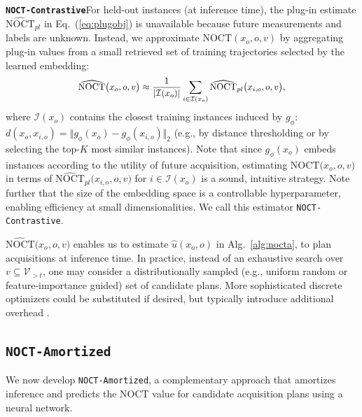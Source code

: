 \textbf{\texttt{NOCT-Contrastive}}\quad For held-out instances (at inference time), the plug-in estimate $\widehat{\mathrm{NOCT}}_{pl}$ in Eq.~(\ref{eq:plugobj}) is unavailable because future measurements and labels are unknown. Instead, we approximate $\mathrm{NOCT}(x_o,o,v)$ by aggregating plug-in values from a small retrieved set of training trajectories selected by the learned embedding:
\begin{equation}
\scalebox{0.93}{$\displaystyle \widehat{\mathrm{NOCT}}\bigl({x}_{o}, o, v\bigr)\approx \frac{1}{|\mathcal{I}(x_o)|}\sum_{i \in \mathcal{I}(x_o)} \widehat{\mathrm{NOCT}}_{pl}\bigl({x}_{i,o}, o, v\bigr),$} 
\label{eq:noctanp}
\end{equation}
where $\mathcal{I}(x_o)$ contains the closest training instances induced by $g_\phi$: $d(x_o, x_{i,o}) = \Vert g_\phi{(x_o)} - g_\phi{(x_{i,o})} \Vert_{2}$ (e.g., by distance thresholding or by selecting the top-$K$ most similar instances). Note that since $g_\phi(x_{o})$ embeds instances according to the utility of future acquisition, estimating $\mathrm{NOCT}\bigl({x}_{o}, o, v\bigr)$ in terms of $\widehat{\mathrm{NOCT}}_{pl}\bigl({x}_{i,o}, o, v\bigr)$ for $i\in \mathcal{I}(x_o)$ is a sound, intuitive strategy. Note further that the size of the embedding space is a controllable hyperparameter, enabling efficiency at small dimensionalities. We call this estimator \texttt{NOCT-Contrastive}.

$\widehat{\mathrm{NOCT}}\bigl({x}_{o}, o, v\bigr)$ enables us to estimate $\hat{u}(x_o, o)$ in Alg.~\ref{alg:nocta}, to plan acquisitions at inference time. In practice, instead of an exhaustive search over  $v\subseteq \mathcal{V}_{>t}$, one may consider a distributionally sampled (e.g., uniform random or feature-importance guided) set of candidate plans. 
More sophisticated discrete optimizers could be substituted if desired, but typically introduce additional overhead \citep{parker2014discrete, rajeev1992discrete}.

\subsection{\texttt{NOCT-Amortized}}
\label{subsec:param}

We now develop \texttt{NOCT-Amortized}, a complementary
approach that amortizes inference and predicts the NOCT value for candidate acquisition plans using a neural network. %


